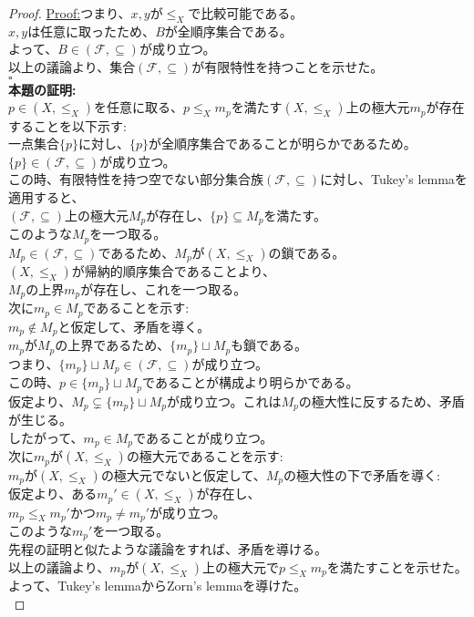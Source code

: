 \documentclass{jreport}
\newenvironment{claimproof}[1]{\par\noindent\underline{Proof:}\space#1}{\hfill $\square$}
\begin{document}
\begin{proof}
\begin{claimproof}
		つまり、$x,y$が$\le_X$で比較可能である。\\
		$x,y$は任意に取ったため、$B$が全順序集合である。\\
		よって、$B \in (\mathcal{F}, \subseteq )$が成り立つ。\\
		以上の議論より、集合$(\mathcal{F}, \subseteq )$が有限特性を持つことを示せた。\\
	\end{claimproof}
\\
	\textbf{本題の証明:}\\
	$p \in (X, \le_X)$を任意に取る、$p \le_X m_p$を満たす$(X,\le_X)$上の極大元$m_p$が存在することを以下示す:\\
		一点集合$\{p\}$に対し、$\{p\}$が全順序集合であることが明らかであるため。\\
		$\{p\} \in (\mathcal{F}, \subseteq )$が成り立つ。\\
		この時、有限特性を持つ空でない部分集合族$(\mathcal{F}, \subseteq )$に対し、Tukey's lemmaを適用すると、\\
		$(\mathcal{F}, \subseteq )$上の極大元$M_p$が存在し、$\{p\} \subseteq M_p$を満たす。\\
		このような$M_p$を一つ取る。\\
		$M_p \in (\mathcal{F}, \subseteq )$であるため、$M_p$が$(X, \le_X)$の鎖である。\\
		$(X,\le_X)$が帰納的順序集合であることより、\\
		$M_p$の上界$m_p$が存在し、これを一つ取る。\\
		次に$m_p \in M_p$であることを示す:\\
		$m_p \notin M_p$と仮定して、矛盾を導く。\\
		$m_p$が$M_p$の上界であるため、$\{m_p\}\sqcup M_p$も鎖である。\\
		つまり、$\{m_p\}\sqcup M_p \in (\mathcal{F}, \subseteq )$が成り立つ。\\
		この時、$p \in\{m_p\}\sqcup M_p $であることが構成より明らかである。\\
		仮定より、$M_p \subsetneq \{m_p\}\sqcup M_p $が成り立つ。これは$M_p$の極大性に反するため、矛盾が生じる。\\
		したがって、$m_p \in M_p$であることが成り立つ。\\
		次に$m_p$が$(X,\le_X)$の極大元であることを示す:\\
		$m_p$が$(X,\le_X)$の極大元でないと仮定して、$M_p$の極大性の下で矛盾を導く:\\
		仮定より、ある$m_p' \in (X,\le_X)$が存在し、\\
		$m_p \le_X m_p'$かつ$m_p \neq m_p'$が成り立つ。\\
		このような$m_p'$を一つ取る。\\
		先程の証明と似たような議論をすれば、矛盾を導ける。\\
		以上の議論より、$m_p$が$(X,\le_X)$上の極大元で$p \le_X m_p$を満たすことを示せた。\\
		よって、Tukey's lemmaからZorn's lemmaを導けた。\\
\end{proof}
\newpage
\end{document}
